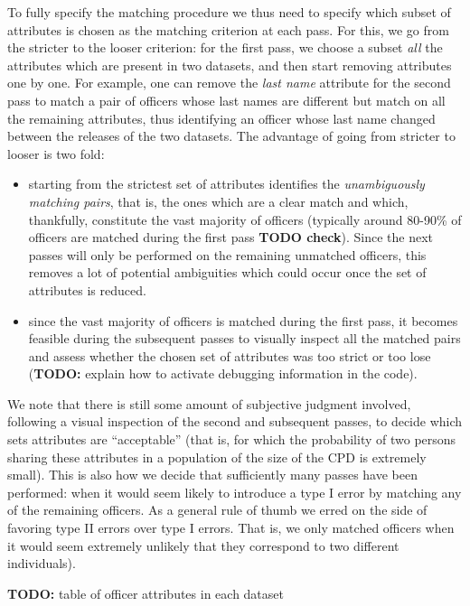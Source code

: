 To fully specify the matching procedure we thus need to specify which subset of
attributes is chosen as the matching criterion at each pass. For this, we go
from the stricter to the looser criterion: for the first pass, we choose
a subset \emph{all} the attributes which are present in two datasets, and then
start removing attributes one by one. For example, one can remove the
\emph{last name} attribute for the second pass to match a pair of officers
whose last names are different but match on all the remaining attributes, thus
identifying an officer whose last name changed between the releases of the two
datasets. The advantage of going from stricter to looser is two fold:
\begin{itemize}
	\item starting from the strictest set of attributes identifies the
		\emph{unambiguously matching pairs}, that is, the ones which are
		a clear match and which, thankfully, constitute the vast majority of
		officers (typically around 80-90\% of officers are matched during the
		first pass \textbf{TODO check}). Since the next passes will only be
		performed on the remaining unmatched officers, this removes a lot of
		potential ambiguities which could occur once the set of attributes is
		reduced.
	\item since the vast majority of officers is matched during the first pass,
		it becomes feasible during the subsequent passes to visually inspect all
		the matched pairs and assess whether the chosen set of attributes was
		too strict or too lose (\textbf{TODO:} explain how to activate
		debugging information in the code).
\end{itemize}

We note that there is still some amount of subjective judgment involved,
following a visual inspection of the second and subsequent passes, to decide
which sets attributes are ``acceptable'' (that is, for which the probability of
two persons sharing these attributes in a population of the size of the CPD is
extremely small). This is also how we decide that sufficiently many passes have
been performed: when it would seem likely to introduce a type I error by
matching any of the remaining officers. As a general rule of thumb we erred on
the side of favoring type II errors over type I errors. That is, we only
matched officers when it would seem extremely unlikely that they correspond to
two different individuals).

\textbf{TODO:} table of officer attributes in each dataset

